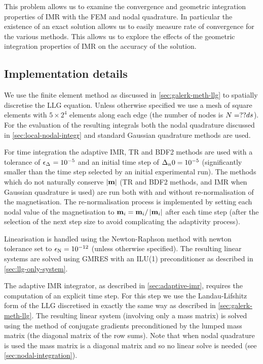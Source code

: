 This problem allows us to examine the convergence and geometric integration properties of IMR with the FEM and nodal quadrature.
In particular the existence of an exact solution allows us to easily measure rate of convergence for the various methods.
This allows us to explore the effects of the geometric integration properties of IMR on the accuracy of the solution.


\subsection{Implementation details}
\label{sec:impl-deta}

We use the finite element method as discussed in \cref{sec:galerk-meth-llg} to spatially discretise the LLG equation.
Unless otherwise specified we use a mesh of square elements with $5 \times 2^4$ elements along each edge (\ie the number of nodes is $N = ??ds$).
For the evaluation of the resulting integrals both the nodal quadrature discussed in \cref{sec:local-nodal-integr} and standard Gaussian quadrature methods are used.

For time integration the adaptive IMR, TR and BDF2 methods are used with a tolerance of $\epsilon_{\Delta_{}} = 10^{-5}$ and an initial time step of $\Delta_{n}{0} = 10^{-5}$ (significantly smaller than the time step selected by an initial experimental run).
The methods which do not naturally conserve $\left|{\boldsymbol{\mathrm{m}}} \right|$ (TR and BDF2 methods, and IMR when Gaussian quadrature is used) are run both with and without re-normalisation of the magnetisation.
The re-normalisation process is implemented by setting each nodal value of the magnetisation to $\boldsymbol{\mathrm{m}}_i = \boldsymbol{\mathrm{m}}_i/\left|{\boldsymbol{\mathrm{m}}_i} \right|$ after each time step (after the selection of the next step size to avoid complicating the adaptivity process).

Linearisation is handled using the Newton-Raphson method with newton tolerance set to $\epsilon_{\mathrm{N}} = 10^{-12}$ (unless otherwise specified).
The resulting linear systems are solved using GMRES with an ILU(1) preconditioner as described in \cref{sec:llg-only-system}.

The adaptive IMR integrator, as described in \cref{sec:adaptive-imr}, requires the computation of an explicit time step.
For this step we use the Landau-Lifshitz form of the LLG discretised in exactly the same way as described in \cref{sec:galerk-meth-llg}.
The resulting linear system (involving only a mass matrix) is solved using the method of conjugate gradients preconditioned by the lumped mass matrix (\ie the diagonal matrix of the row sums).
Note that when nodal quadrature is used the mass matrix is a diagonal matrix and so no linear solve is needed (see \cref{sec:nodal-integration}).


